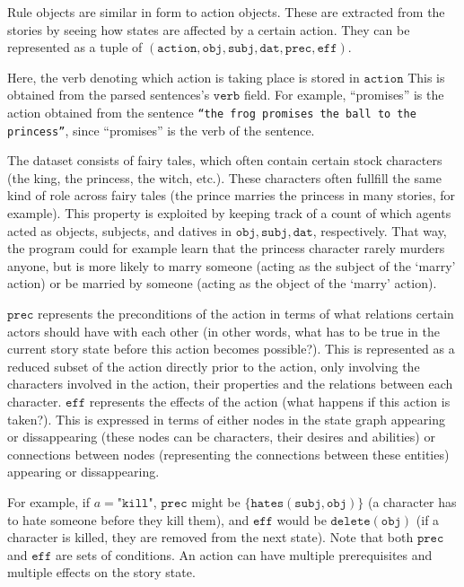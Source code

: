 Rule objects are similar in form to action objects. These are extracted from 
the stories by seeing how states are affected by a certain action.
They can be represented as a tuple of $(\texttt{action}, \texttt{obj}, \texttt{subj}, \texttt{dat},
\texttt{prec}, \texttt{eff})$.

Here, the verb denoting which action is taking place is stored in 
$\texttt{action}$
This is obtained from the parsed sentences's $\texttt{verb}$ field.
For example, ``promises'' is the action obtained from the
sentence \texttt{``the frog promises the ball to the princess''}, since
``promises'' is the verb of the sentence.

The dataset consists of fairy tales, which often contain certain stock 
characters (the king, the princess, the witch, etc.). These characters often
fullfill the same kind of role across fairy tales (the prince marries the
princess in many stories, for example).
This property is exploited by keeping track of a count of which agents
acted as objects, subjects, and datives in 
$\texttt{obj}, \texttt{subj}, \texttt{dat}$, respectively. That way, the program
could for example learn that the princess character rarely murders anyone, but
is more likely to marry someone (acting as the subject of the `marry' action) or
be married by someone (acting as the object of the `marry' action).

$\texttt{prec}$ represents the preconditions of the action in terms of what 
relations certain actors should have with each other (in other words, what has
to be true in the current story state before this action becomes possible?).
This is represented as a reduced subset of the action directly prior to the
action, only involving the characters involved in the action, their properties
and the relations between each character.
$\texttt{eff}$ represents the effects of the action (what
happens if this action is taken?). This is expressed in terms of either nodes in the
state graph appearing or dissappearing (these nodes can be characters, their
desires and abilities) or connections between nodes (representing the
connections between these entities) appearing or dissappearing.

For example, if $a = \texttt{"kill"}$, $\texttt{prec}$ might be 
$ \{\texttt{hates}(\texttt{subj}, \texttt{obj})\} $ (a character has to hate someone 
before they kill them), and $\texttt{eff}$ would be ${\texttt{delete}(\texttt{obj})}$
(if a character is killed, they are removed from the next state).
Note that both $\texttt{prec}$ and $\texttt{eff}$ are sets of conditions.
An action can have multiple prerequisites and multiple effects on the story state.

